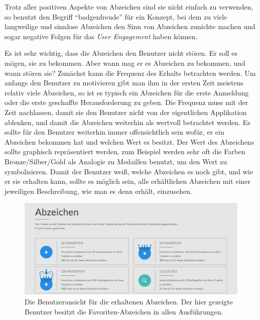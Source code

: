 \documentclass[12pt,twoside]{book}
\begin{document}
Trotz aller positiven Aspekte von Abzeichen sind sie nicht einfach zu verwenden, so benutzt \citep[pp. 56]{zichermann2011gamification} den Begriff ``badgenfreude'' für ein Konzept, bei dem zu viele langweilige und sinnlose Abzeichen den Sinn von Abzeichen zunichte machen und sogar negative Folgen für das \textit{User Engagement} haben können.

Es ist sehr wichtig, dass die Abzeichen den Benutzer nicht stören. Er soll es mögen, sie zu bekommen. Aber wann mag er es Abzeichen zu bekommen, und wann stören sie?
Zunächst kann die Frequenz des Erhalts betrachten werden. Um anfangs den Benutzer zu motivieren gibt man ihm in der ersten Zeit meistens relativ viele Abzeichen, so ist es typisch ein Abzeichen für die erste Anmeldung oder die erste geschaffte Herausforderung zu geben.
Die Frequenz muss mit der Zeit nachlassen, damit sie den Benutzer nicht von der eigentlichen Applikation ablenken, und damit die Abzeichen weiterhin als wertvoll betrachtet werden.
Es sollte für den Benutzer weiterhin immer offensichtlich sein wofür, er ein Abzeichen bekommen hat und welchen Wert es besitzt. Der Wert des Abzeichens sollte graphisch repräsentiert werden, zum Beispiel werden sehr oft die Farben Bronze/Silber/Gold als Analogie zu Medaillen benutzt, um den Wert zu symbolisieren.
Damit der Benutzer weiß, welche Abzeichen es noch gibt, und wie er sie erhalten kann, sollte es möglich sein, alle erhältlichen Abzeichen mit einer jeweiligen Beschreibung, wie man es denn erhält, einzusehen.

\begin{figure}[htbp]
    \centering
    \includegraphics[width=1.0\textwidth]{images/infoboard_badges.png}
    \caption{Die Benutzeransicht für die erhaltenen Abzeichen. Der hier gezeigte Benutzer besitzt die Favoriten-Abzeichen in allen Ausführungen.}
    \label{fig:badges}
\end{figure}
\end{document}
